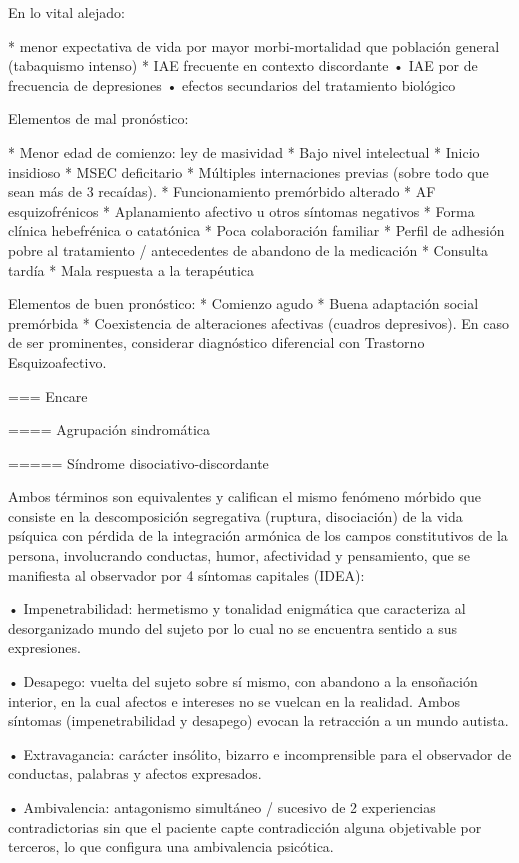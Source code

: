 En lo vital alejado:

* menor expectativa de vida por mayor morbi-mortalidad que población general (tabaquismo intenso)
* IAE frecuente en contexto discordante • IAE por de frecuencia de depresiones • efectos secundarios del tratamiento biológico

Elementos de mal pronóstico:

* Menor edad de comienzo: ley de masividad
* Bajo nivel intelectual
* Inicio insidioso
* MSEC deficitario
* Múltiples internaciones previas (sobre todo que sean más de 3 recaídas).
* Funcionamiento premórbido alterado
* AF esquizofrénicos
* Aplanamiento afectivo u otros síntomas negativos
* Forma clínica hebefrénica o catatónica
* Poca colaboración familiar
* Perfil de adhesión pobre al tratamiento / antecedentes de abandono de la medicación
* Consulta tardía
* Mala respuesta a la terapéutica

Elementos de buen pronóstico:
* Comienzo agudo
* Buena adaptación social premórbida
* Coexistencia de alteraciones afectivas (cuadros depresivos). En caso de ser prominentes, considerar diagnóstico diferencial con Trastorno Esquizoafectivo.

=== Encare

==== Agrupación sindromática

===== Síndrome disociativo-discordante

Ambos términos son equivalentes y califican el mismo fenómeno mórbido que consiste en la descomposición segregativa (ruptura, disociación) de la vida psíquica con pérdida de la integración armónica de los campos constitutivos de la persona, involucrando conductas, humor, afectividad y pensamiento, que se manifiesta al observador por 4 síntomas capitales (IDEA):

• Impenetrabilidad: hermetismo y tonalidad enigmática que caracteriza al desorganizado mundo del sujeto por lo cual no se encuentra sentido a sus expresiones.

• Desapego: vuelta del sujeto sobre sí mismo, con abandono a la ensoñación interior, en la cual afectos e intereses no se vuelcan en la realidad. Ambos síntomas (impenetrabilidad y desapego) evocan la retracción a un mundo autista.

• Extravagancia: carácter insólito, bizarro e incomprensible para el observador de conductas, palabras y afectos expresados.

• Ambivalencia: antagonismo simultáneo / sucesivo de 2 experiencias contradictorias sin que el paciente capte contradicción alguna objetivable por terceros, lo que configura una ambivalencia psicótica.

